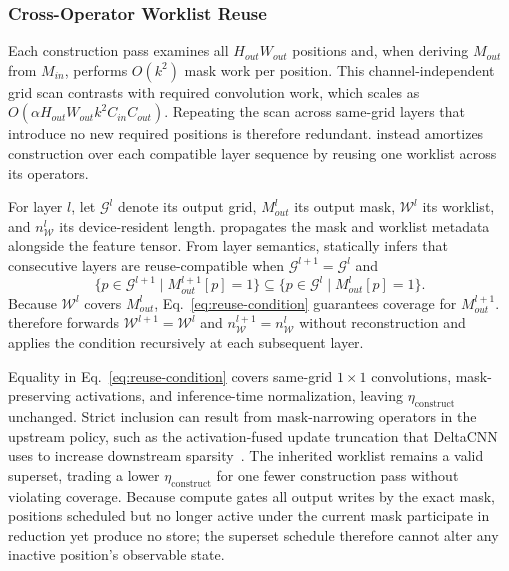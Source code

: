 \subsubsection{Cross-Operator Worklist Reuse}
\label{sec:design:reuse}

Each construction pass examines all $H_{out}W_{out}$ positions and, when
deriving $M_{out}$ from $M_{in}$, performs $O(k^2)$ mask work per position.
This channel-independent grid scan contrasts with required convolution work,
which scales as $O(\alpha H_{out}W_{out}k^2C_{in}C_{out})$. Repeating the scan
across same-grid layers that introduce no new required positions is therefore
redundant. \sysname instead amortizes construction over each compatible layer
sequence by reusing one worklist across its operators.

For layer $l$, let $\mathcal{G}^l$ denote its output grid, $M^l_{out}$ its
output mask, $\mathcal{W}^l$ its worklist, and $n^l_{\mathcal{W}}$ its
device-resident length. \sysname propagates the mask and worklist metadata
alongside the feature tensor. From layer semantics, \sysname statically infers
that consecutive layers are reuse-compatible when
$\mathcal{G}^{l+1}=\mathcal{G}^l$ and
\begin{equation}
  \{p\in\mathcal{G}^{l+1} \mid M^{l+1}_{out}[p]=1\}
  \subseteq
  \{p\in\mathcal{G}^l \mid M^l_{out}[p]=1\} .
  \label{eq:reuse-condition}
\end{equation}
Because $\mathcal{W}^l$ covers $M^l_{out}$,
Eq.~\ref{eq:reuse-condition} guarantees coverage for $M^{l+1}_{out}$.
\sysname therefore forwards $\mathcal{W}^{l+1}=\mathcal{W}^l$ and
$n^{l+1}_{\mathcal{W}}=n^l_{\mathcal{W}}$ without reconstruction and applies
the condition recursively at each subsequent layer.

Equality in Eq.~\ref{eq:reuse-condition} covers same-grid $1\times1$
convolutions, mask-preserving activations, and inference-time normalization,
leaving $\eta_{\mathrm{construct}}$ unchanged. Strict inclusion can result from
mask-narrowing operators in the upstream policy, such as the activation-fused
update truncation that DeltaCNN uses to increase downstream
sparsity~\cite{deltacnn}. The inherited worklist remains a valid superset,
trading a lower $\eta_{\mathrm{construct}}$ for one fewer construction pass
without violating coverage. Because compute gates all output writes by the
exact mask, positions scheduled but no longer active under the current mask
participate in reduction yet produce no store; the superset schedule therefore
cannot alter any inactive position's observable state.

